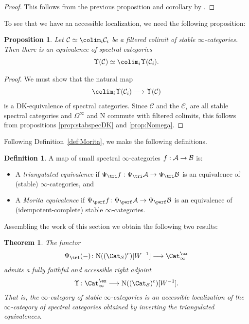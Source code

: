 \documentclass{amsart}
\renewcommand{\to}{\mathchoice{\longrightarrow}{\rightarrow}{\rightarrow}{\rightarrow}}
\let\catsymbfont\mathcal
\newcommand{\aA}{{\catsymbfont{A}}}
\newcommand{\aB}{{\catsymbfont{B}}}
\newcommand{\aC}{{\catsymbfont{C}}}
\newcommand{\N}{\mathrm{N}}
\newcommand{\stabcat}{\Cat_\i^{\ex}}
\newcommand{\Spcat}{\Cat_\mathcal{S}}%
\renewcommand{\i}{\infty}
\newcommand{\spect}{\Upsilon}
\numberwithin{equation}{section}
\newtheorem{theorem}[equation]{Theorem}
\newtheorem{proposition}[equation]{Proposition}
\theoremstyle{definition}
\newtheorem{definition}[equation]{Definition}
\begin{document}
\begin{proof}
This follows from the previous proposition and corollary by \cite[5.2.7.4]{HTT}.
\end{proof}

To see that we have an accessible localization, we need the following
proposition:

\begin{proposition}\label{prop:specfiltered}
Let $\aC\simeq\colim_i\aC_i$ be a filtered colimit of stable
$\i$-categories.  Then there is an equivalence of spectral categories
\[
\spect(\aC)\simeq\colim_i\spect(\aC_i).
\] 
\end{proposition}

\begin{proof}
We must show that the natural map
\[
\colim_i\spect(\aC_i)\to\spect(\aC)
\]
is a DK-equivalence of spectral categories.
Since $\aC$ and the $\aC_i$ are all stable spectral categories and
$\Omega^\infty$ and $\N$ commute with filtered colimits, this follows
from propositions \ref{prop:stabspecDK} and \ref{prop:Nomega}.
\end{proof}

Following Definition~\ref{def:Morita}, we make the following definitions.

\begin{definition}\label{def:imorita}
A map of small spectral $\i$-categories $f:\aA\to\aB$ is:
\begin{itemize}
\item A {\em triangulated equivalence} if
  $\Psi_{\tri}{f}:\Psi_{\tri}{\aA}\to\Psi_{\tri}{\aB}$ is an
  equivalence of (stable) $\i$-categories, and
\item A {\em Morita equivalence} if $\Psi_{\perf}f \colon \Psi_{\perf}
  \aA \to \Psi_{\perf} \aB$ is an equivalence of (idempotent-complete)
  stable $\i$-categories.
\end{itemize}
\end{definition}

Assembling the work of this section we obtain the following two results:

\begin{theorem}\label{thm:stable}
The functor
\[
\Psi_{\tri}(-) \colon \N((\Spcat)^{\mathrm{c}})[W^{-1}] \to\stabcat
\]
admits a fully faithful and accessible right adjoint
\[
\spect \colon \stabcat \to \N((\Spcat)^{\mathrm{c}})[W^{-1}].
\]
That is, the $\i$-category of stable $\i$-categories is an accessible 
localization of the $\i$-category of spectral categories obtained by
inverting the triangulated equivalences.
\end{theorem}
\end{document}

